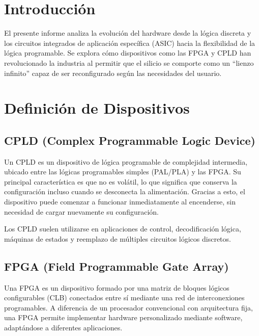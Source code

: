 \documentclass[a4paper,12pt]{article}
\begin{document}
	\section*{Introducción}
	El presente informe analiza la evolución del hardware desde la lógica discreta y los circuitos integrados de aplicación específica (ASIC) hacia la flexibilidad de la lógica programable. Se explora cómo dispositivos como las FPGA y CPLD han revolucionado la industria al permitir que el silicio se comporte como un ``lienzo infinito'' capaz de ser reconfigurado según las necesidades del usuario.
	

	
	\section*{Definición de Dispositivos}
	
	\subsection*{CPLD (Complex Programmable Logic Device)}
	
	Un CPLD es un dispositivo de lógica programable de complejidad intermedia, ubicado entre las lógicas programables simples (PAL/PLA) y las FPGA. Su principal característica es que no es volátil, lo que significa que conserva la configuración incluso cuando se desconecta la alimentación. Gracias a esto, el dispositivo puede comenzar a funcionar inmediatamente al encenderse, sin necesidad de cargar nuevamente su configuración.
	
	Los CPLD suelen utilizarse en aplicaciones de control, decodificación lógica, máquinas de estados y reemplazo de múltiples circuitos lógicos discretos.
	
	\subsection*{FPGA (Field Programmable Gate Array)}
	
	Una FPGA es un dispositivo formado por una matriz de bloques lógicos configurables (CLB) conectados entre sí mediante una red de interconexiones programables. A diferencia de un procesador convencional con arquitectura fija, una FPGA permite implementar hardware personalizado mediante software, adaptándose a diferentes aplicaciones.
	
\end{document}
